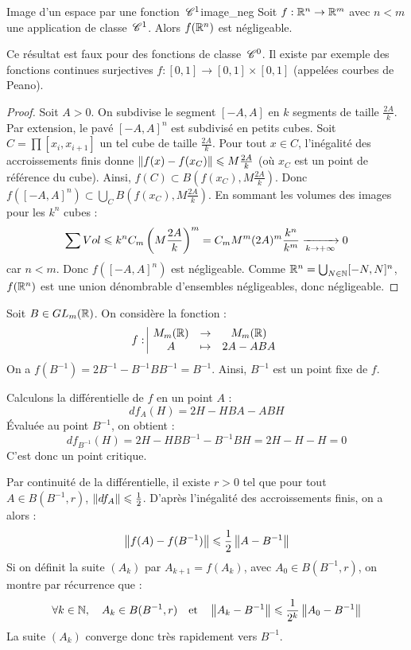 \begin{proposition}{Image d'un espace par une fonction \texorpdfstring{$\,\mathscr C^{1}$}{C1}}{image_neg}
    Soit $f : \mathbb{R}^n \to \mathbb{R}^m$ avec $n < m$ une application de classe $\,\mathscr C^{1}$. Alors $f(\mathbb{R}^n)$ est négligeable.
\end{proposition}

\begin{remarque}
    Ce résultat est faux pour des fonctions de classe $\,\mathscr C^{0}$. Il existe par exemple des fonctions continues surjectives $f : [0,1] \to [0,1] \times [0,1]$ (appelées courbes de Peano).
\end{remarque}

\begin{proof}
    Soit $A > 0$. On subdivise le segment $[-A, A]$ en $k$ segments de taille $\frac{2A}{k}$. Par extension, le pavé $[-A, A]^n$ est subdivisé en petits cubes.
    Soit $C = \prod [x_i, x_{i+1}]$ un tel cube de taille $\frac{2A}{k}$.
    Pour tout $x \in C$, l'inégalité des accroissements finis donne $\left\|f(x) - f(x_C)\right\| \leqslant M \frac{2A}{k}$ (où $x_C$ est un point de référence du cube).
    Ainsi, $f(C) \subset B\left(f(x_C), M \frac{2A}{k}\right)$.
    Donc $f([-A,A]^n) \subset \bigcup_{C} B\left(f(x_C), M \frac{2A}{k}\right)$.
    En sommant les volumes des images pour les $k^n$ cubes :
    \[ \sum Vol \leqslant k^n C_m \left(M \frac{2A}{k}\right)^m = C_m M^m (2A)^m \frac{k^n}{k^m} \xrightarrow[k \to +\infty]{} 0 \]
    car $n < m$. Donc $f([-A,A]^n)$ est négligeable.
    Comme $\mathbb{R}^n = \bigcup_{N \in \mathbb{N}} [-N,N]^n$, $f(\mathbb{R}^n)$ est une union dénombrable d'ensembles négligeables, donc négligeable.
\end{proof}

\begin{exemple}[title=Inversion de matrice par la méthode de Newton]
    Soit $B \in GL_m(\mathbb{R})$. On considère la fonction :
    \[ f: \space \begin{array}{|ccc} \displaystyle M_m(\mathbb{R}) & \to & \displaystyle M_m(\mathbb{R}) \\ \displaystyle A & \mapsto & \displaystyle 2A - ABA \end{array} \]
    On a $f(B^{-1}) = 2B^{-1} - B^{-1}BB^{-1} = B^{-1}$. Ainsi, $B^{-1}$ est un point fixe de $f$.
    
    Calculons la différentielle de $f$ en un point $A$ :
    \[ df_A(H) = 2H - HBA - ABH \]
    Évaluée au point $B^{-1}$, on obtient :
    \[ df_{B^{-1}}(H) = 2H - HBB^{-1} - B^{-1}BH = 2H - H - H = 0 \]
    C'est donc un point critique.
    
    Par continuité de la différentielle, il existe $r > 0$ tel que pour tout $A \in B(B^{-1}, r)$, $\left\|df_A\right\| \leqslant \frac{1}{2}$.
    D'après l'inégalité des accroissements finis, on a alors :
    \[ \left\|f(A) - f(B^{-1})\right\| \leqslant \frac{1}{2} \left\|A - B^{-1}\right\| \]
    Si on définit la suite $(A_k)$ par $A_{k+1} = f(A_k)$, avec $A_0 \in B(B^{-1}, r)$, on montre par récurrence que :
    \[ \forall k \in \mathbb{N}, \quad A_k \in B(B^{-1}, r) \quad \text{et} \quad \left\|A_k - B^{-1}\right\| \leqslant \frac{1}{2^k} \left\|A_0 - B^{-1}\right\| \]
    La suite $(A_k)$ converge donc très rapidement vers $B^{-1}$.
\end{exemple}

